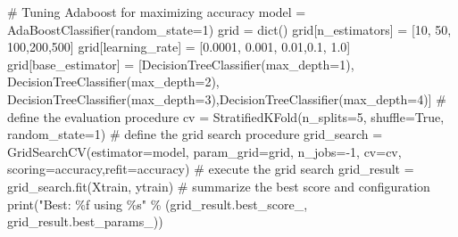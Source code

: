 \documentclass[
  letterpaper,
  DIV=11,
  numbers=noendperiod]{scrreprt}
\newenvironment{Shaded}{\begin{snugshade}}{\end{snugshade}}
\newcommand{\BuiltInTok}[1]{\textcolor[rgb]{0.00,0.23,0.31}{#1}}
\newcommand{\CommentTok}[1]{\textcolor[rgb]{0.37,0.37,0.37}{#1}}
\newcommand{\DecValTok}[1]{\textcolor[rgb]{0.68,0.00,0.00}{#1}}
\newcommand{\FloatTok}[1]{\textcolor[rgb]{0.68,0.00,0.00}{#1}}
\newcommand{\NormalTok}[1]{\textcolor[rgb]{0.00,0.23,0.31}{#1}}
\newcommand{\OperatorTok}[1]{\textcolor[rgb]{0.37,0.37,0.37}{#1}}
\newcommand{\SpecialCharTok}[1]{\textcolor[rgb]{0.37,0.37,0.37}{#1}}
\newcommand{\StringTok}[1]{\textcolor[rgb]{0.13,0.47,0.30}{#1}}
\newcommand{\VariableTok}[1]{\textcolor[rgb]{0.07,0.07,0.07}{#1}}
\begin{document}
\begin{Shaded}
\begin{Highlighting}[]
\CommentTok{\# Tuning Adaboost for maximizing accuracy}
\NormalTok{model }\OperatorTok{=}\NormalTok{ AdaBoostClassifier(random\_state}\OperatorTok{=}\DecValTok{1}\NormalTok{)}
\NormalTok{grid }\OperatorTok{=} \BuiltInTok{dict}\NormalTok{()}
\NormalTok{grid[}\StringTok{\textquotesingle{}n\_estimators\textquotesingle{}}\NormalTok{] }\OperatorTok{=}\NormalTok{ [}\DecValTok{10}\NormalTok{, }\DecValTok{50}\NormalTok{, }\DecValTok{100}\NormalTok{,}\DecValTok{200}\NormalTok{,}\DecValTok{500}\NormalTok{]}
\NormalTok{grid[}\StringTok{\textquotesingle{}learning\_rate\textquotesingle{}}\NormalTok{] }\OperatorTok{=}\NormalTok{ [}\FloatTok{0.0001}\NormalTok{, }\FloatTok{0.001}\NormalTok{, }\FloatTok{0.01}\NormalTok{,}\FloatTok{0.1}\NormalTok{, }\FloatTok{1.0}\NormalTok{]}
\NormalTok{grid[}\StringTok{\textquotesingle{}base\_estimator\textquotesingle{}}\NormalTok{] }\OperatorTok{=}\NormalTok{ [DecisionTreeClassifier(max\_depth}\OperatorTok{=}\DecValTok{1}\NormalTok{), DecisionTreeClassifier(max\_depth}\OperatorTok{=}\DecValTok{2}\NormalTok{), }
\NormalTok{                          DecisionTreeClassifier(max\_depth}\OperatorTok{=}\DecValTok{3}\NormalTok{),DecisionTreeClassifier(max\_depth}\OperatorTok{=}\DecValTok{4}\NormalTok{)]}
\CommentTok{\# define the evaluation procedure}
\NormalTok{cv }\OperatorTok{=}\NormalTok{ StratifiedKFold(n\_splits}\OperatorTok{=}\DecValTok{5}\NormalTok{, shuffle}\OperatorTok{=}\VariableTok{True}\NormalTok{, random\_state}\OperatorTok{=}\DecValTok{1}\NormalTok{)}
\CommentTok{\# define the grid search procedure}
\NormalTok{grid\_search }\OperatorTok{=}\NormalTok{ GridSearchCV(estimator}\OperatorTok{=}\NormalTok{model, param\_grid}\OperatorTok{=}\NormalTok{grid, n\_jobs}\OperatorTok{={-}}\DecValTok{1}\NormalTok{, cv}\OperatorTok{=}\NormalTok{cv, scoring}\OperatorTok{=}\StringTok{\textquotesingle{}accuracy\textquotesingle{}}\NormalTok{,refit}\OperatorTok{=}\StringTok{\textquotesingle{}accuracy\textquotesingle{}}\NormalTok{)}
\CommentTok{\# execute the grid search}
\NormalTok{grid\_result }\OperatorTok{=}\NormalTok{ grid\_search.fit(Xtrain, ytrain)}
\CommentTok{\# summarize the best score and configuration}
\BuiltInTok{print}\NormalTok{(}\StringTok{"Best: }\SpecialCharTok{\%f}\StringTok{ using }\SpecialCharTok{\%s}\StringTok{"} \OperatorTok{\%}\NormalTok{ (grid\_result.best\_score\_, grid\_result.best\_params\_))}
\end{Highlighting}
\end{Shaded}
\end{document}
